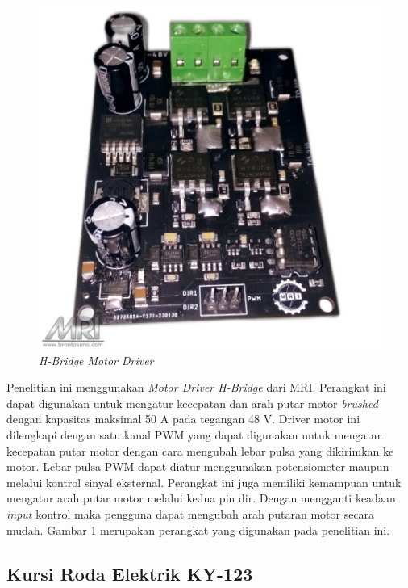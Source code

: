 \begin{figure} [ht]
    \centering
        \includegraphics[scale=0.2]{gambar/MotorDriver.png}
        \caption{\emph{H-Bridge Motor Driver}}
        \label{fig:DriverMotor}
\end{figure}

Penelitian ini menggunakan \emph{Motor Driver H-Bridge} dari MRI. Perangkat ini dapat digunakan untuk mengatur kecepatan dan arah putar motor \emph{brushed} dengan kapasitas maksimal 50 A pada tegangan 48 V. Driver motor ini dilengkapi dengan satu kanal PWM yang dapat digunakan untuk mengatur kecepatan putar motor dengan cara mengubah lebar pulsa yang dikirimkan ke motor. Lebar pulsa PWM dapat diatur menggunakan potensiometer maupun melalui kontrol sinyal eksternal. Perangkat ini juga memiliki kemampuan untuk mengatur arah putar motor melalui kedua pin dir. Dengan mengganti keadaan \emph{input} kontrol maka pengguna dapat mengubah arah putaran motor secara mudah. Gambar \ref{fig:DriverMotor} merupakan perangkat yang digunakan pada penelitian ini.

\subsection{Kursi Roda Elektrik KY-123}

